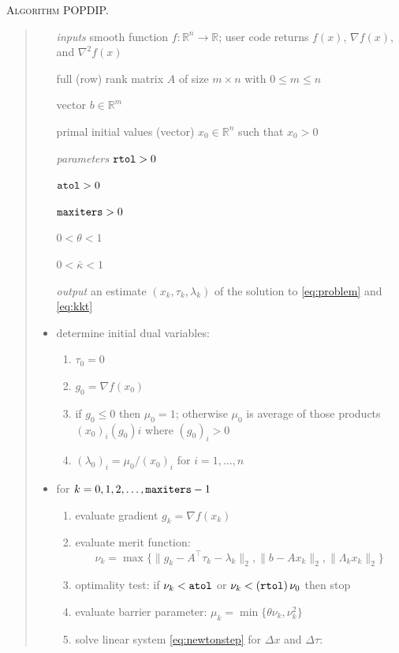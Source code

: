 \documentclass[11pt]{article}
\newcommand{\RR}{\mathbb{R}}
\newcommand{\grad}{\nabla}
\begin{document}
\bigskip
\noindent \textsc{Algorithm POPDIP.}
\begin{quote}
\begin{itemize}
\item[\emph{inputs}]  smooth function $f:\RR^n\to\RR$; user code returns $f(x)$, $\grad f(x)$, and $\grad^2 f(x)$
\item[]  full (row) rank matrix $A$ of size $m\times n$ with $0\le m\le n$
\item[]  vector $b\in\RR^m$
\item[]  primal initial values (vector) $x_0\in\RR^n$ such that $x_0 > 0$
\item[\emph{parameters}]  $\text{\texttt{rtol}}>0$
\item[]  $\text{\texttt{atol}}>0$
\item[]  $\text{\texttt{maxiters}}>0$
\item[]  $0<\theta<1$
\item[]  $0<\bar\kappa<1$
\item[\emph{output}]  an estimate $(x_k,\tau_k,\lambda_k)$ of the solution to \eqref{eq:problem} and \eqref{eq:kkt}
\item  determine initial dual variables:
    \renewcommand{\labelenumi}{(\roman{enumi})}
    \begin{enumerate}
    \item $\tau_0 = 0$
    \item $g_0 = \grad f(x_0)$
    \item if $g_0 \le 0$ then $\mu_0=1$; otherwise $\mu_0$ is average of those products $(x_0)_i (g_0)i$ where $(g_0)_i > 0$
    \item $(\lambda_0)_i = \mu_0 / (x_0)_i$ for $i=1,\dots,n$
    \end{enumerate}
\item  for $k=0,1,2,\dots,\text{\texttt{maxiters}}-1$
    \renewcommand{\labelenumi}{(\roman{enumi})}
    \begin{enumerate}
    \item evaluate gradient $g_k = \grad f(x_k)$
    \item evaluate merit function:
    $$\nu_k = \max\{\|g_k-A^\top \tau_k - \lambda_k\|_2,\|b-Ax_k\|_2,\|\Lambda_k x_k\|_2\}$$
    \item optimality test: if $\nu_k<\text{\texttt{atol}}$ or $\nu_k<(\text{\texttt{rtol}})\, \nu_0$ then stop
    \item evaluate barrier parameter: $\mu_k = \min\{\theta \nu_k,\nu_k^2\}$
    \item solve linear system \eqref{eq:newtonstep} for $\Delta x$ and $\Delta \tau$:

\end{enumerate}
\end{itemize}
\end{quote}
\end{document}
